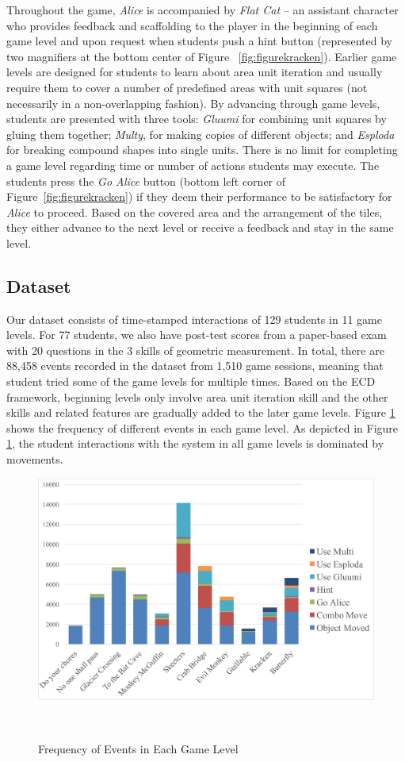 \documentclass{sigchi}
\begin{document}
Throughout the game,  \textit {Alice} is accompanied by \textit {Flat Cat} -- an assistant character who provides feedback and scaffolding to the player in the beginning of each game level and upon request when students push a hint button (represented by two magnifiers at the bottom center of Figure ~\ref{fig:figurekracken}). Earlier game levels are designed for students to learn about area unit iteration and usually require them to cover a number of predefined areas with unit squares (not necessarily in a non-overlapping fashion). By advancing through game levels, students are presented with three tools: \textit {Gluumi} for combining unit squares by gluing them together; \textit {Multy}, for making copies of different objects; and \textit {Esploda} for breaking compound shapes into single units.  There is no limit for completing a game level regarding time or number of actions students may execute. The students press the \textit {Go Alice} button (bottom left corner of Figure~\ref{fig:figurekracken}) if they deem their performance to be satisfactory for \textit {Alice} to proceed. Based on the covered area and the arrangement of the tiles, they either advance to the next level or receive a feedback and stay in the same level.

\subsection{Dataset} 
Our dataset consists of time-stamped interactions of 129 students in 11 game levels. 
For 77 students, we also have post-test scores from a paper-based exam with 20 questions in the 3 skills of geometric measurement.
In total, there are 88,458 events recorded in the dataset from 1,510 game sessions, meaning that student tried some of the game levels for multiple times.
Based on the ECD framework, beginning levels only involve area unit iteration skill and the other skills and related features are gradually added to the later game levels.
Figure \ref{fig:frequency} shows the frequency of different events in each game level. As depicted in Figure \ref{fig:frequency}, the student interactions with the system in all game levels is dominated by movements.

\begin{figure}
	\centering
	\includegraphics[width=0.9\columnwidth]{figures/frequency}
	\caption{Frequency of Events in Each Game Level}~\label{fig:frequency}
\end{figure}
\end{document}
